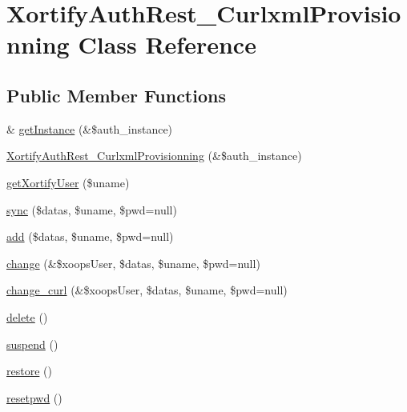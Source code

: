 \hypertarget{class_xortify_auth_rest___curlxml_provisionning}{\section{Xortify\-Auth\-Rest\-\_\-\-Curlxml\-Provisionning Class Reference}
\label{class_xortify_auth_rest___curlxml_provisionning}
}
\subsection*{Public Member Functions}
\begin{DoxyCompactItemize}
\item 
\& \hyperlink{class_xortify_auth_rest___curlxml_provisionning_a2c8eaa915c70d75289ac8a03686194f9}{get\-Instance} (\&\$auth\-\_\-instance)
\item 
\hyperlink{class_xortify_auth_rest___curlxml_provisionning_adc9122f707545243b2cc3d8f5b542095}{Xortify\-Auth\-Rest\-\_\-\-Curlxml\-Provisionning} (\&\$auth\-\_\-instance)
\item 
\hyperlink{class_xortify_auth_rest___curlxml_provisionning_a041d726ac26672547ed1504e8e0117aa}{get\-Xortify\-User} (\$uname)
\item 
\hyperlink{class_xortify_auth_rest___curlxml_provisionning_a35dc08b0f2138eb818ff95345b73bcff}{sync} (\$datas, \$uname, \$pwd=null)
\item 
\hyperlink{class_xortify_auth_rest___curlxml_provisionning_adfc9fcef01e7bd7b2f47e8e79d51fc63}{add} (\$datas, \$uname, \$pwd=null)
\item 
\hyperlink{class_xortify_auth_rest___curlxml_provisionning_ae1f0971b9712c794620cf309164e43af}{change} (\&\$xoops\-User, \$datas, \$uname, \$pwd=null)
\item 
\hyperlink{class_xortify_auth_rest___curlxml_provisionning_aba6f598c234d191a3b3934f90b35fd9f}{change\-\_\-curl} (\&\$xoops\-User, \$datas, \$uname, \$pwd=null)
\item 
\hyperlink{class_xortify_auth_rest___curlxml_provisionning_a13bdffdd926f26b825ea57066334ff01}{delete} ()
\item 
\hyperlink{class_xortify_auth_rest___curlxml_provisionning_ad73006a505121228f3b075c2409787d2}{suspend} ()
\item 
\hyperlink{class_xortify_auth_rest___curlxml_provisionning_aa1371f22826cf8cde4454c9b467203d0}{restore} ()
\item 
\hyperlink{class_xortify_auth_rest___curlxml_provisionning_a06d70fbd3a2db390b6f2530c0076628e}{resetpwd} ()
\end{DoxyCompactItemize}
